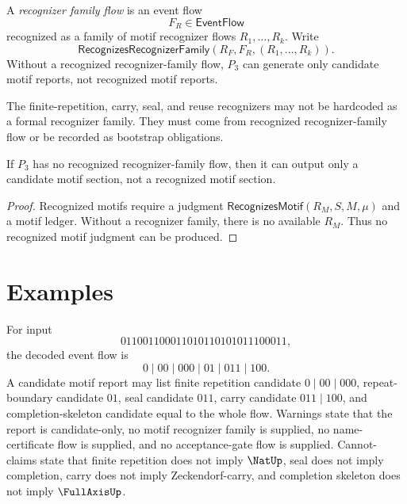 \begin{definition}
\label{def:motif-report-recognizer-family-flow}
A \emph{recognizer family flow} is an event flow
$$
  F_R\in\mathsf{EventFlow}
$$
recognized as a family of motif recognizer flows $R_1,\ldots,R_k$. Write
$$
  \mathsf{RecognizesRecognizerFamily}(R_F,F_R,(R_1,\ldots,R_k)).
$$
Without a recognized recognizer-family flow, $P_3$ can generate only candidate motif reports, not recognized motif reports.
\end{definition}

\begin{principle}
\label{prin:motif-report-no-hardcoded-family}
The finite-repetition, carry, seal, and reuse recognizers may not be hardcoded as a formal recognizer family. They must come from recognized recognizer-family flow or be recorded as bootstrap obligations.
\end{principle}

\begin{theorem}
\label{thm:motif-report-without-family-candidate-only}
If $P_3$ has no recognized recognizer-family flow, then it can output only a candidate motif section, not a recognized motif section.
\end{theorem}

\begin{proof}
Recognized motifs require a judgment $\mathsf{RecognizesMotif}(R_M,S,M,\mu)$ and a motif ledger. Without a recognizer family, there is no available $R_M$. Thus no recognized motif judgment can be produced.
\end{proof}

\section{Examples}
\label{sec:motif-report-examples}

\begin{example}
\label{ex:motif-report-candidate-completion}
For input
$$
  011001100011010110101011100011,
$$
the decoded event flow is
$$
  0\mid 00\mid 000\mid 01\mid 011\mid 100.
$$
A candidate motif report may list finite repetition candidate $0\mid 00\mid 000$, repeat-boundary candidate $01$, seal candidate $011$, carry candidate $011\mid 100$, and completion-skeleton candidate equal to the whole flow. Warnings state that the report is candidate-only, no motif recognizer family is supplied, no name-certificate flow is supplied, and no acceptance-gate flow is supplied. Cannot-claims state that finite repetition does not imply $\NatUp$, seal does not imply completion, carry does not imply Zeckendorf-carry, and completion skeleton does not imply $\FullAxisUp$.
\end{example}


